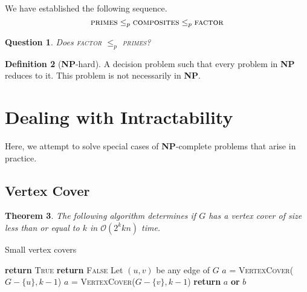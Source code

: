 \documentclass[10pt, oneside, reqno]{amsart}
\theoremstyle{plain}%
\newtheorem{thm}{Theorem}[section]
\newtheorem{question}[thm]{Question}
\theoremstyle{definition}
\newtheorem{defn}[thm]{Definition}
\theoremstyle{remark}
\newcommand{\bigo}[1]{\mathcal{O}(#1)}
\begin{document}
We have established the following sequence.\[
    \textsc{primes} \leq_p \textsc{composites} \leq_p \textsc{factor}
\]

\begin{question}
    Does \textsc{factor} $\leq_p$ \textsc{primes}?
\end{question}


\begin{defn}[\textbf{NP}-hard]
    A decision problem such that every problem in \textbf{NP} reduces to it.  This problem is not necessarily in \textbf{NP}.
\end{defn}





\section{Dealing with Intractability} %
\label{sec:dealing_with_intractability}
Here, we attempt to solve special cases of \textbf{NP}-complete problems that arise in practice.  

\subsection{Vertex Cover} %
\label{sub:vertex_cover}

\begin{thm}
    The following algorithm determines if $G$ has a vertex cover of size less than or equal to $k$ in $\bigo{2^k k n}$ time.
\end{thm}

\begin{algorithm}[H]
    \label{alg:Vecter Cover}
    \caption{Small vertex covers}
    \begin{algorithmic}[1]
             {\textbf{return} \textsc{True}}
            \EndIf
             \textbf{return} \textsc{False}
            \EndIf
            \State
            \State Let $(u,v)$ be any edge of $G$
            \State $a$ = \textsc{VertexCover}($G-\{u\}, k-1$)
            \State $a$ = \textsc{VertexCover}($G-\{v\}, k-1$)
            \State \textbf{return} $a$ \textbf{or} $b$
        \EndProcedure
    \end{algorithmic}
\end{algorithm}
\end{document}
